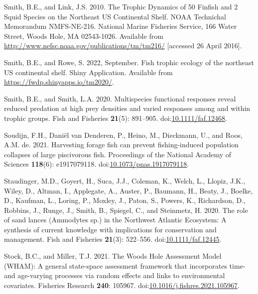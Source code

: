 \documentclass[
]{article}
\newlength{\cslhangindent}
\newlength{\cslentryspacingunit} %
\newenvironment{CSLReferences}[2] %
 {%
  \setlength{\parindent}{0pt}
  \ifodd #1
  \let\oldpar\par
  \def\par{\hangindent=\cslhangindent\oldpar}
  \fi
  \setlength{\parskip}{#2\cslentryspacingunit}
 }%
 {}
\begin{document}
\begin{CSLReferences}{1}{0}
\leavevmode{}%
Smith, B.E., and Link, J.S. 2010. The {Trophic} {Dynamics} of 50 {Finfish} and 2 {Squid} {Species} on the {Northeast} {US} {Continental} {Shelf}. {NOAA} {Technichal} {Memorandum} {NMFS}-{NE}-216. National Marine Fisheries Service, 166 Water Street, Woods Hole, MA 02543-1026. Available from \url{http://www.nefsc.noaa.gov/publications/tm/tm216/} {[}accessed 26 April 2016{]}.

\leavevmode{}%
Smith, B.E., and Rowe, S. 2022, September. Fish trophic ecology of the northeast {US} continental shelf. {Shiny} {Application}. Available from \url{https://fwdp.shinyapps.io/tm2020/}.

\leavevmode{}%
Smith, B.E., and Smith, L.A. 2020. Multispecies functional responses reveal reduced predation at high prey densities and varied responses among and within trophic groups. Fish and Fisheries \textbf{21}(5): 891--905. doi:\href{https://doi.org/10.1111/faf.12468}{10.1111/faf.12468}.

\leavevmode{}%
Soudijn, F.H., Daniël van Denderen, P., Heino, M., Dieckmann, U., and Roos, A.M. de. 2021. Harvesting forage fish can prevent fishing-induced population collapses of large piscivorous fish. Proceedings of the National Academy of Sciences \textbf{118}(6): e1917079118. doi:\href{https://doi.org/10.1073/pnas.1917079118}{10.1073/pnas.1917079118}.

\leavevmode{}%
Staudinger, M.D., Goyert, H., Suca, J.J., Coleman, K., Welch, L., Llopiz, J.K., Wiley, D., Altman, I., Applegate, A., Auster, P., Baumann, H., Beaty, J., Boelke, D., Kaufman, L., Loring, P., Moxley, J., Paton, S., Powers, K., Richardson, D., Robbins, J., Runge, J., Smith, B., Spiegel, C., and Steinmetz, H. 2020. The role of sand lances ({Ammodytes} sp.) in the {Northwest} {Atlantic} {Ecosystem}: {A} synthesis of current knowledge with implications for conservation and management. Fish and Fisheries \textbf{21}(3): 522--556. doi:\href{https://doi.org/10.1111/faf.12445}{10.1111/faf.12445}.

\leavevmode{}%
Stock, B.C., and Miller, T.J. 2021. The {Woods} {Hole} {Assessment} {Model} ({WHAM}): {A} general state-space assessment framework that incorporates time- and age-varying processes via random effects and links to environmental covariates. Fisheries Research \textbf{240}: 105967. doi:\href{https://doi.org/10.1016/j.fishres.2021.105967}{10.1016/j.fishres.2021.105967}.


\end{CSLReferences}
\end{document}
